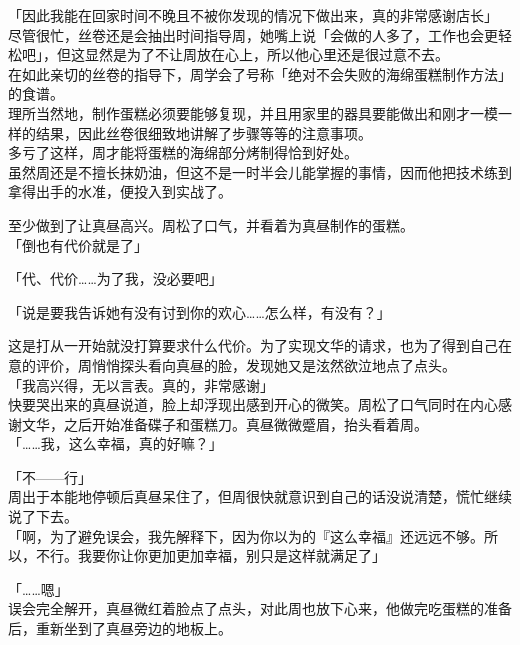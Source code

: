「因此我能在回家时间不晚且不被你发现的情况下做出来，真的非常感谢店长」\\

尽管很忙，丝卷还是会抽出时间指导周，她嘴上说「会做的人多了，工作也会更轻松吧」，但这显然是为了不让周放在心上，所以他心里还是很过意不去。\\

在如此亲切的丝卷的指导下，周学会了号称「绝对不会失败的海绵蛋糕制作方法」的食谱。\\

理所当然地，制作蛋糕必须要能够复现，并且用家里的器具要能做出和刚才一模一样的结果，因此丝卷很细致地讲解了步骤等等的注意事项。\\

多亏了这样，周才能将蛋糕的海绵部分烤制得恰到好处。\\

虽然周还是不擅长抹奶油，但这不是一时半会儿能掌握的事情，因而他把技术练到拿得出手的水准，便投入到实战了。

至少做到了让真昼高兴。周松了口气，并看着为真昼制作的蛋糕。\\

「倒也有代价就是了」

「代、代价……为了我，没必要吧」

「说是要我告诉她有没有讨到你的欢心……怎么样，有没有？」

这是打从一开始就没打算要求什么代价。为了实现文华的请求，也为了得到自己在意的评价，周悄悄探头看向真昼的脸，发现她又是泫然欲泣地点了点头。\\

「我高兴得，无以言表。真的，非常感谢」\\

快要哭出来的真昼说道，脸上却浮现出感到开心的微笑。周松了口气同时在内心感谢文华，之后开始准备碟子和蛋糕刀。真昼微微蹙眉，抬头看着周。\\

「……我，这么幸福，真的好嘛？」

「不——行」\\

周出于本能地停顿后真昼呆住了，但周很快就意识到自己的话没说清楚，慌忙继续说了下去。\\

「啊，为了避免误会，我先解释下，因为你以为的『这么幸福』还远远不够。所以，不行。我要你让你更加更加幸福，别只是这样就满足了」

「……嗯」\\

误会完全解开，真昼微红着脸点了点头，对此周也放下心来，他做完吃蛋糕的准备后，重新坐到了真昼旁边的地板上。\\

